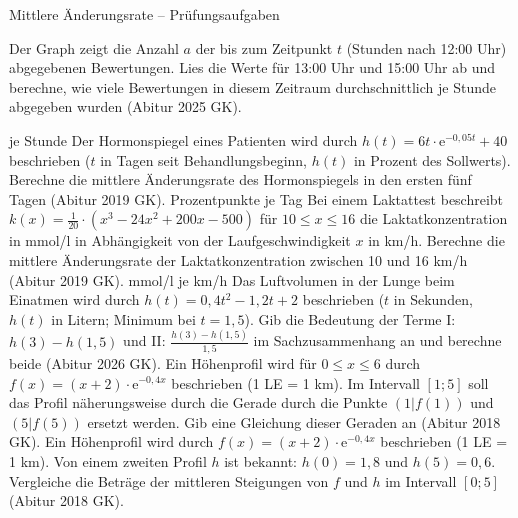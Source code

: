 \begin{aufgabe}{Mittlere Änderungsrate – Prüfungsaufgaben}
\begin{teile}
\teil Der Graph zeigt die Anzahl $a$ der bis zum Zeitpunkt $t$ (Stunden nach 12:00 Uhr) abgegebenen Bewertungen. Lies die Werte für 13:00 Uhr und 15:00 Uhr ab und berechne, wie viele Bewertungen in diesem Zeitraum durchschnittlich je Stunde abgegeben wurden \hfill (Abitur 2025 GK).

\begin{ksys}[xmin=0,xmax=4,ymin=0,ymax=1800,xstep=1,ystep=200,xlabel=t in h,ylabel=a,ablesen]\end{ksys}
\leerfeld je Stunde
\teil Der Hormonspiegel eines Patienten wird durch $h(t) = 6t \cdot \mathrm{e}^{-0{,}05t} + 40$ beschrieben ($t$ in Tagen seit Behandlungsbeginn, $h(t)$ in Prozent des Sollwerts). Berechne die mittlere Änderungsrate des Hormonspiegels in den ersten fünf Tagen \hfill (Abitur 2019 GK). \leerfeld Prozentpunkte je Tag
\teil Bei einem Laktattest beschreibt $k(x) = \frac{1}{20} \cdot (x^3 - 24x^2 + 200x - 500)$ für $10 \le x \le 16$ die Laktatkonzentration in mmol/l in Abhängigkeit von der Laufgeschwindigkeit $x$ in km/h. Berechne die mittlere Änderungsrate der Laktatkonzentration zwischen 10 und 16 km/h \hfill (Abitur 2019 GK). \leerfeld mmol/l je km/h
\teil Das Luftvolumen in der Lunge beim Einatmen wird durch $h(t) = 0{,}4t^2 - 1{,}2t + 2$ beschrieben ($t$ in Sekunden, $h(t)$ in Litern; Minimum bei $t = 1{,}5$). Gib die Bedeutung der Terme I: $h(3) - h(1{,}5)$ und II: $\frac{h(3) - h(1{,}5)}{1{,}5}$ im Sachzusammenhang an und berechne beide \hfill (Abitur 2026 GK).
\teil Ein Höhenprofil wird für $0 \le x \le 6$ durch $f(x) = (x + 2) \cdot \mathrm{e}^{-0{,}4x}$ beschrieben (1 LE = 1 km). Im Intervall $[1; 5]$ soll das Profil näherungsweise durch die Gerade durch die Punkte $(1 | f(1))$ und $(5 | f(5))$ ersetzt werden. Gib eine Gleichung dieser Geraden an \hfill (Abitur 2018 GK).
\teil Ein Höhenprofil wird durch $f(x) = (x + 2) \cdot \mathrm{e}^{-0{,}4x}$ beschrieben (1 LE = 1 km). Von einem zweiten Profil $h$ ist bekannt: $h(0) = 1{,}8$ und $h(5) = 0{,}6$. Vergleiche die Beträge der mittleren Steigungen von $f$ und $h$ im Intervall $[0; 5]$ \hfill (Abitur 2018 GK).
\end{teile}
\end{aufgabe}

